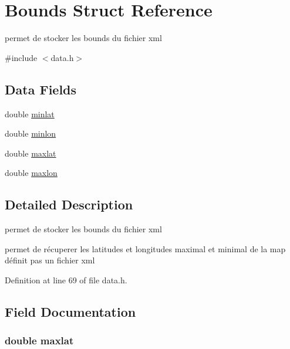 \hypertarget{struct_bounds}{}\section{Bounds Struct Reference}
\label{struct_bounds}


permet de stocker les bounds du fichier xml  




{\ttfamily \#include $<$data.\+h$>$}

\subsection*{Data Fields}
\begin{DoxyCompactItemize}
\item 
double \hyperlink{struct_bounds_ae6882148ee59d0266307fd7a39b8945c}{minlat}
\item 
double \hyperlink{struct_bounds_a59ff75088f2d17feafb6a6cb7b52cc0c}{minlon}
\item 
double \hyperlink{struct_bounds_a037868ceabb80ff01a9a3e9d05ae4abd}{maxlat}
\item 
double \hyperlink{struct_bounds_a2ac2c59e3c0eb6ec8661c8ff1ea04b83}{maxlon}
\end{DoxyCompactItemize}


\subsection{Detailed Description}
permet de stocker les bounds du fichier xml 

permet de récuperer les latitudes et longitudes maximal et minimal de la map définit pas un fichier xml 

Definition at line 69 of file data.\+h.



\subsection{Field Documentation}
\subsubsection[{\texorpdfstring{maxlat}{maxlat}}]{\setlength{\rightskip}{0pt plus 5cm}double maxlat}\hypertarget{struct_bounds_a037868ceabb80ff01a9a3e9d05ae4abd}{}\label{struct_bounds_a037868ceabb80ff01a9a3e9d05ae4abd}


